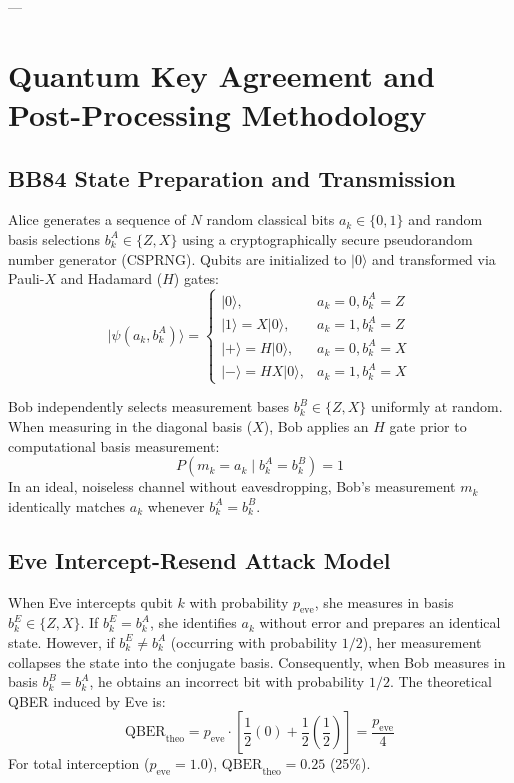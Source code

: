 \documentclass[journal,10pt,twocolumn]{article}
\begin{document}
---

\section{Quantum Key Agreement and Post-Processing Methodology}

\subsection{BB84 State Preparation and Transmission}
Alice generates a sequence of $N$ random classical bits $a_k \in \{0, 1\}$ and random basis selections $b_k^A \in \{Z, X\}$ using a cryptographically secure pseudorandom number generator (CSPRNG). Qubits are initialized to $|0\rangle$ and transformed via Pauli-$X$ and Hadamard ($H$) gates:
\begin{equation}
|\psi(a_k, b_k^A)\rangle = 
\begin{cases}
|0\rangle, & a_k=0, b_k^A=Z \\
|1\rangle = X|0\rangle, & a_k=1, b_k^A=Z \\
|+\rangle = H|0\rangle, & a_k=0, b_k^A=X \\
|-\rangle = H X|0\rangle, & a_k=1, b_k^A=X
\end{cases}
\end{equation}

Bob independently selects measurement bases $b_k^B \in \{Z, X\}$ uniformly at random. When measuring in the diagonal basis ($X$), Bob applies an $H$ gate prior to computational basis measurement:
\begin{equation}
P(m_k = a_k \mid b_k^A = b_k^B) = 1
\end{equation}
In an ideal, noiseless channel without eavesdropping, Bob's measurement $m_k$ identically matches $a_k$ whenever $b_k^A = b_k^B$.

\subsection{Eve Intercept-Resend Attack Model}
When Eve intercepts qubit $k$ with probability $p_{\text{eve}}$, she measures in basis $b_k^E \in \{Z, X\}$. If $b_k^E = b_k^A$, she identifies $a_k$ without error and prepares an identical state. However, if $b_k^E \neq b_k^A$ (occurring with probability $1/2$), her measurement collapses the state into the conjugate basis. Consequently, when Bob measures in basis $b_k^B = b_k^A$, he obtains an incorrect bit with probability $1/2$. The theoretical QBER induced by Eve is:
\begin{equation}
\text{QBER}_{\text{theo}} = p_{\text{eve}} \cdot \left[ \frac{1}{2}(0) + \frac{1}{2}\left(\frac{1}{2}\right) \right] = \frac{p_{\text{eve}}}{4}
\label{eq:qber_eve}
\end{equation}
For total interception ($p_{\text{eve}} = 1.0$), $\text{QBER}_{\text{theo}} = 0.25$ (25\%).
\end{document}
